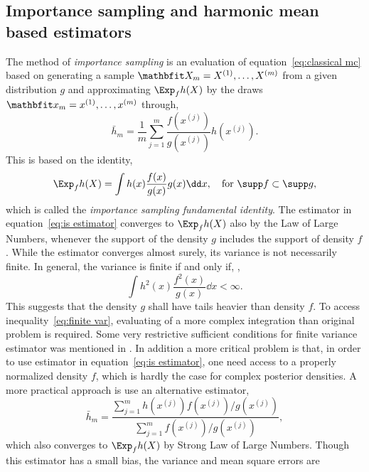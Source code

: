 \subsection{Importance sampling and harmonic mean based estimators}
\label{sub:Importance sampling and harmonic mean based estimators}

The method of \emph{importance sampling} is an evaluation of
equation~\eqref{eq:classical mc} based on generating a sample $\bfX_m =
\mcvec{X}{m}$ from a given distribution $g$ and approximating $\Exp_f h(X)$ by
the draws $\bfx_m = \mcvec{x}{m}$ through,
\begin{equation}
  \bar{h}_m = \frac{1}{m}\sum_{j=1}^m
  \frac{f(x^{(j)})}{g(x^{(j)})} h(x^{(j)}).
  \label{eq:is estimator}
\end{equation}
This is based on the identity,
\begin{equation}
  \Exp_f h(X) = \int h(x)\frac{f(x)}{g(x)}g(x)\dd x,
  \quad \text{for } \supp f \subset \supp g,
\end{equation}
which is called the \emph{importance sampling fundamental identity}. The
estimator in equation~\eqref{eq:is estimator} converges to $\Exp_f h(X)$ also
by the Law of Large Numbers, whenever the support of the density $g$ includes
the support of density $f$. While the estimator converges almost surely, its
variance is not necessarily finite. In general, the variance is finite if and
only if, \parencite[see][sec.~3.3]{Robert2004},
\begin{equation}
  \int h^2(x)\frac{f^2(x)}{g(x)}\dd x < \infty.
  \label{eq:finite var}
\end{equation}
This suggests that the density $g$ shall have tails heavier than density $f$.
To access inequality~\eqref{eq:finite var}, evaluating of a more complex
integration than original problem is required. Some very restrictive
sufficient conditions for finite variance estimator was mentioned in
\textcite{Geweke1989}. In addition a more critical problem is that, in order
to use estimator in equation~\eqref{eq:is estimator}, one need access to a
properly normalized density $f$, which is hardly the case for complex
posterior densities. A more practical approach is use an alternative
estimator,
\begin{equation}
  \bar{h}_m =
  \frac{\sum_{j = 1}^m h(x^{(j)}) f(x^{(j)}) / g(x^{(j)})}
  {\sum_{j=1}^m f(x^{(j)})/g(x^{(j)})},
  \label{eq:is est}
\end{equation}
which also converges to $\Exp_f h(X)$ by Strong Law of Large Numbers. Though
this estimator has a small bias, the variance and mean square errors are
